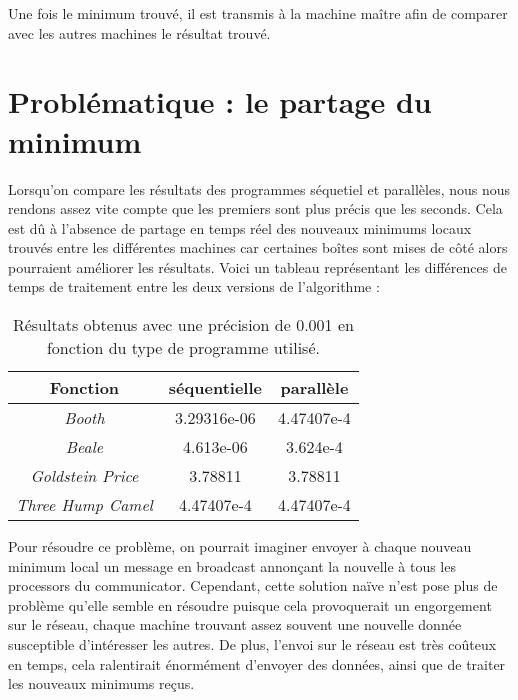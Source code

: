 			Une fois le minimum trouvé, il est transmis à la machine maître afin de comparer avec les autres machines le résultat trouvé.
		
	\section{Problématique : le partage du minimum}
		Lorsqu'on compare les résultats des programmes séquetiel et parallèles, nous nous rendons assez vite compte que les premiers sont plus précis que les seconds. Cela est dû à l'absence de partage en temps réel des nouveaux minimums locaux trouvés entre les différentes machines car certaines boîtes sont mises de côté alors pourraient améliorer les résultats. Voici un tableau représentant les différences de temps de traitement entre les deux versions de l'algorithme :\\
		
		\begin{table}[h!]
  			\begin{center}
				\begin{tabular}{ | c | c | c | }
					\hline
					\textbf{Fonction}		& \textbf{séquentielle} 	& \textbf{parallèle} \\ \hline
					\emph{Booth}			& 3.29316e-06				& 4.47407e-4 \\ \hline
					\emph{Beale} 			& 4.613e-06 				& 3.624e-4 \\ \hline
					\emph{Goldstein Price} 	& 3.78811 					& 3.78811 \\ \hline
					\emph{Three Hump Camel}	& 4.47407e-4 				& 4.47407e-4 \\ \hline
				\end{tabular}
				\caption{Résultats obtenus avec une précision de 0.001 en fonction du type de programme utilisé.}
  			\end{center}
  		\end{table}
		
		Pour résoudre ce problème, on pourrait imaginer envoyer à chaque nouveau minimum local un message en broadcast annonçant la nouvelle à tous les processors du communicator. Cependant, cette solution naïve n'est pose plus de problème qu'elle semble en résoudre puisque cela provoquerait un engorgement sur le réseau, chaque machine trouvant assez souvent une nouvelle donnée susceptible d'intéresser les autres. De plus, l'envoi sur le réseau est très coûteux en temps, cela ralentirait énormément d'envoyer des données, ainsi que de traiter les nouveaux minimums reçus. \\
		
